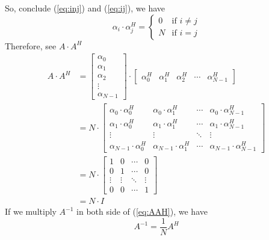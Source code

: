 \documentclass{article}
\begin{document}
So, conclude (\ref{eq:inj}) and (\ref{eq:ij}), we have
\begin{equation}
    \alpha_i \cdot \alpha_j^H =
    \begin{cases}
        0 & \text{if } i \neq j \\ 
        N & \text{if } i = j
    \end{cases}
\label{eq:multi_ij}
\end{equation}
Therefore, see $A \cdot A^H$
\begin{equation}
\begin{aligned}
    A \cdot A^H &= 
    \begin{bmatrix}
        \alpha_0 \\ \alpha_1 \\ \alpha_2 \\ \vdots \\ \alpha_{N - 1}
    \end{bmatrix}
    \cdot
    \begin{bmatrix}
        \alpha_0^H & \alpha_1^H & \alpha_2^H & \cdots & \alpha_{N - 1}^H
    \end{bmatrix} \\ 
    &= N \cdot 
    \begin{bmatrix}
        \alpha_0 \cdot \alpha_0^H & \alpha_0 \cdot \alpha_1^H & \cdots & \alpha_0 \cdot \alpha_{N - 1}^H \\ 
        \alpha_1 \cdot \alpha_0^H & \alpha_1 \cdot \alpha_1^H & \cdots & \alpha_1 \cdot \alpha_{N - 1}^H \\ 
        \vdots & \vdots & \ddots & \vdots \\ 
        \alpha_{N - 1} \cdot \alpha_0^H & \alpha_{N - 1} \cdot \alpha_1^H & \cdots & \alpha_{N - 1} \cdot \alpha_{N - 1}^H
    \end{bmatrix} \\
    &= N \cdot 
    \begin{bmatrix}
        1 & 0 & \cdots & 0 \\ 
        0 & 1 & \cdots & 0 \\ 
        \vdots & \vdots & \ddots & \vdots \\ 
        0 & 0 & \cdots & 1
    \end{bmatrix} \\
    &= N \cdot I
\end{aligned}
\label{eq:AAH}
\end{equation}
If we multiply $A^{-1}$ in both side of (\ref{eq:AAH}), we have
\begin{equation}
    A^{-1} = \frac1N A^H
\label{eq:A-1}
\end{equation}
\end{document}
